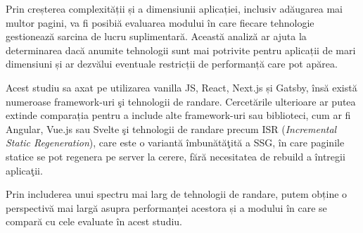 \documentclass[12pt, a4paper]{report}
\begin{document}
Prin creșterea complexității și a dimensiunii aplicației, inclusiv ad\u augarea mai multor pagini, va fi posibi\u a evaluarea modului în care fiecare tehnologie gestionează sarcina de lucru suplimentară. Această analiză ar ajuta la determinarea dacă anumite tehnologii sunt mai potrivite pentru aplicații de mari dimensiuni și ar dezvălui eventuale restricții de performanță care pot apărea.

Acest studiu sa axat pe utilizarea vanilla JS, React, Next.js și Gatsby, \^ins\u a există numeroase framework-uri \c si tehnologii de randare. Cercet\u arile ulterioare ar putea extinde comparația pentru a include alte framework-uri sau biblioteci, cum ar fi Angular, Vue.js sau Svelte \c si tehnologii de randare precum ISR (\textit{Incremental Static Regeneration}), care este o variant\u a \^imbun\u at\u a\c tit\u a a SSG, \^in care paginile statice se pot regenera pe server la cerere, f\u ar\u a necesitatea de rebuild a \^intregii aplica\c tii. 

Prin includerea unui spectru mai larg de tehnologii de randare, putem obține o perspectivă mai largă asupra performanței acestora și a modului în care se compară cu cele evaluate în acest studiu.



\renewcommand{\bibname}{Bibliografie}

\end{document}
